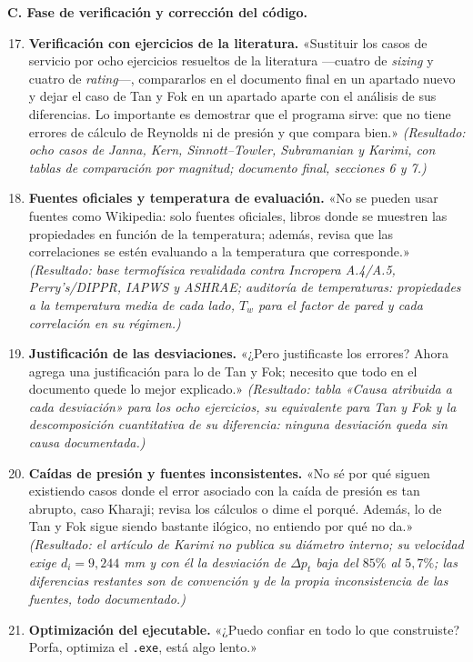 \documentclass[11pt,a4paper]{article}
\begin{document}
\textbf{C. Fase de verificación y corrección del código.}
\begin{enumerate}\setcounter{enumi}{16}
\item \textbf{Verificación con ejercicios de la literatura.} «Sustituir los
casos de servicio por ocho ejercicios resueltos de la literatura ---cuatro
de \emph{sizing} y cuatro de \emph{rating}---, compararlos en el documento
final en un apartado nuevo y dejar el caso de Tan y Fok en un apartado
aparte con el análisis de sus diferencias. Lo importante es demostrar que
el programa sirve: que no tiene errores de cálculo de Reynolds ni de
presión y que compara bien.» \emph{(Resultado: ocho casos de Janna, Kern,
Sinnott--Towler, Subramanian y Karimi, con tablas de comparación por
magnitud; documento final, secciones 6 y 7.)}
\item \textbf{Fuentes oficiales y temperatura de evaluación.} «No se pueden
usar fuentes como Wikipedia: solo fuentes oficiales, libros donde se muestren
las propiedades en función de la temperatura; además, revisa que las
correlaciones se estén evaluando a la temperatura que corresponde.»
\emph{(Resultado: base termofísica revalidada contra Incropera A.4/A.5,
Perry's/DIPPR, IAPWS y ASHRAE; auditoría de temperaturas: propiedades a la
temperatura media de cada lado, $T_w$ para el factor de pared y cada
correlación en su régimen.)}
\item \textbf{Justificación de las desviaciones.} «¿Pero justificaste los
errores? Ahora agrega una justificación para lo de Tan y Fok; necesito que
todo en el documento quede lo mejor explicado.» \emph{(Resultado: tabla
«Causa atribuida a cada desviación» para los ocho ejercicios, su equivalente
para Tan y Fok y la descomposición cuantitativa de su diferencia: ninguna
desviación queda sin causa documentada.)}
\item \textbf{Caídas de presión y fuentes inconsistentes.} «No sé por qué
siguen existiendo casos donde el error asociado con la caída de presión es
tan abrupto, caso Kharaji; revisa los cálculos o dime el porqué. Además, lo
de Tan y Fok sigue siendo bastante ilógico, no entiendo por qué no da.»
\emph{(Resultado: el artículo de Karimi no publica su diámetro interno; su
velocidad exige $d_i = 9{,}244$ mm y con él la desviación de $\Delta p_t$
baja del $85\%$ al $5{,}7\%$; las diferencias restantes son de convención y
de la propia inconsistencia de las fuentes, todo documentado.)}
\item \textbf{Optimización del ejecutable.} «¿Puedo confiar en todo lo que
construiste? Porfa, optimiza el \texttt{.exe}, está algo lento.»

\end{enumerate}
\end{document}

